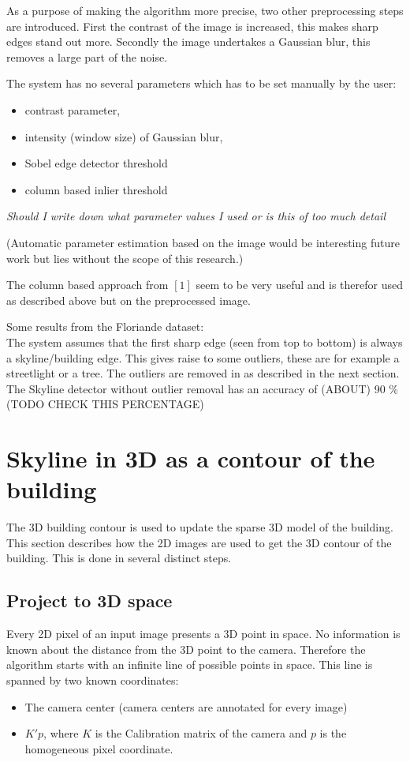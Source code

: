 \documentclass[10pt]{article}
\begin{document}
As a purpose of making the algorithm more precise, two other preprocessing
steps are introduced. First the contrast of the image is increased, this makes
sharp edges stand out more.  Secondly the image undertakes a Gaussian blur,
this removes a large part of the noise.

The system has no several parameters which has to be set manually by the user:
\begin{itemize}
\item contrast parameter, 
\item intensity (window size) of Gaussian blur,
\item Sobel edge detector threshold
\item column based inlier threshold
\end{itemize}
\textit{Should I write down what parameter values I used or is this of too much
detail}

(Automatic parameter estimation based on the image would be interesting future
work but lies without the scope of this research.)

The column based approach from $[1]$ seem to be very useful and is therefor
used as described above but on the preprocessed image.

Some results from the Floriande dataset:
\\
The system assumes that the first sharp edge (seen from top to bottom) is
always a skyline/building edge. This gives raise to some outliers, these are
for example a streetlight or a tree. The outliers are removed in as described in
the next section.  The Skyline detector without outlier removal has an
accuracy of (ABOUT) 90 \% (TODO CHECK THIS PERCENTAGE) 


\section{Skyline in 3D as a contour of the building}
The 3D building contour is used to update the sparse 3D model of the building.
This section describes how the 2D images are used to get the 3D contour of the
building. This is done in several distinct steps.  

\subsection{Project to 3D space}
Every 2D pixel of an input image presents a 3D point in space. No
information is known about the distance from the 3D point to the camera.
Therefore the algorithm starts with an infinite line of possible points in space.
This line is spanned by two known coordinates:\\
\begin{itemize}
	\item The camera center (camera centers are annotated for every image)
	\item $K'p$, where $K$ is the Calibration matrix of the camera and $p$ is the homogeneous pixel coordinate.
\end{itemize}
\end{document}
